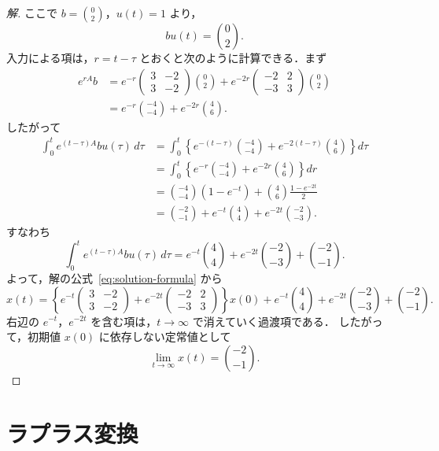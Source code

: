 \documentclass[article,paper=a4paper]{jlreq}
\begin{document}
\begin{proof}[解]
ここで $b=\binom{0}{2}$，$u(t)=1$ より，
\[
  bu(t)=\binom{0}{2}.
\]
入力による項は，$r=t-\tau$ とおくと次のように計算できる．まず
\begin{align*}
  e^{rA}b
    &=
    e^{-r}
    \begin{pmatrix}
      3 & -2\\
      3 & -2
    \end{pmatrix}
    \binom{0}{2}
    +
    e^{-2r}
    \begin{pmatrix}
      -2 & 2\\
      -3 & 3
    \end{pmatrix}
    \binom{0}{2}\\
    &=
    e^{-r}\binom{-4}{-4}
    +
    e^{-2r}\binom{4}{6}.
\end{align*}
したがって
\begin{align*}
  \int_0^t e^{(t-\tau)A}bu(\tau)\,d\tau
    &=
    \int_0^t
      \left\{
        e^{-(t-\tau)}\binom{-4}{-4}
        +
        e^{-2(t-\tau)}\binom{4}{6}
      \right\}d\tau\\
    &=
    \int_0^t
      \left\{
        e^{-r}\binom{-4}{-4}
        +
        e^{-2r}\binom{4}{6}
      \right\}dr\\
    &=
    \binom{-4}{-4}(1-e^{-t})
      +
    \binom{4}{6}\frac{1-e^{-2t}}{2}\\
    &=
    \binom{-2}{-1}
      +
    e^{-t}\binom{4}{4}
      +
    e^{-2t}\binom{-2}{-3}.
\end{align*}
すなわち
\[
  \int_0^t e^{(t-\tau)A}bu(\tau)\,d\tau
    =
    e^{-t}\binom{4}{4}
    +
    e^{-2t}\binom{-2}{-3}
    +
    \binom{-2}{-1}.
\]
よって，解の公式~\eqref{eq:solution-formula} から
\[
  x(t)
    =
    \left\{
      e^{-t}
      \begin{pmatrix}
        3 & -2\\
        3 & -2
      \end{pmatrix}
      +
      e^{-2t}
      \begin{pmatrix}
        -2 & 2\\
        -3 & 3
      \end{pmatrix}
    \right\}x(0)
    +
    e^{-t}\binom{4}{4}
    +
    e^{-2t}\binom{-2}{-3}
    +
    \binom{-2}{-1}.
\]
右辺の $e^{-t}$，$e^{-2t}$ を含む項は，$t\to\infty$ で消えていく過渡項である．
したがって，初期値 $x(0)$ に依存しない定常値として
\[
  \lim_{t\to\infty}x(t)=\binom{-2}{-1}.
\]
\end{proof}

\section{ラプラス変換}
\end{document}
